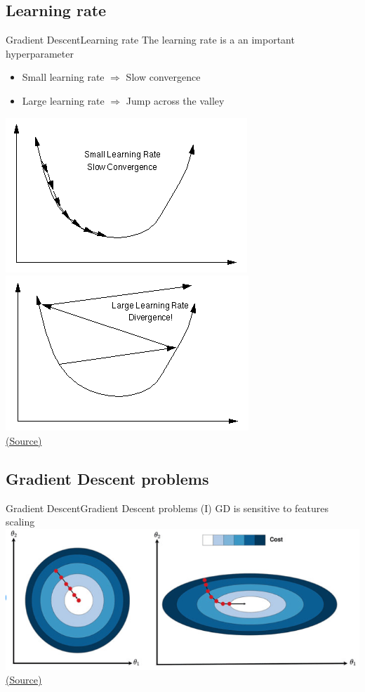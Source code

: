 \documentclass[10pt,compress]{beamer} %
\begin{document}
\subsection{Learning rate}
\begin{frame}{Gradient Descent}{Learning rate}
	The learning rate is a an important hyperparameter
	\begin{itemize}
		\item Small learning rate $\Rightarrow$ Slow convergence
		\item Large learning rate $\Rightarrow$ Jump across the valley
	\end{itemize}

	\bigskip

	\centering
	\includegraphics[width=0.45\linewidth]{figs/nn_learning.png}
	\includegraphics[width=0.45\linewidth]{figs/nn_learning2.png}\\
	\scriptsize \href{http://www.turingfinance.com/misconceptions-about-neural-networks/}{(Source)}
\end{frame}

\subsection{Gradient Descent problems}

\begin{frame}{Gradient Descent}{Gradient Descent problems (I)}
	GD is sensitive to features scaling\\
	\centering \includegraphics[width=0.8\linewidth]{figs/gd-scaling.png}\\
	\scriptsize \href{https://www.researchgate.net/figure/Gradient-descent-with-and-without-input-feature-scaling-Geron-2019-On-the-left-are_fig4_357829499}{(Source)}
\end{frame}
\end{document}
